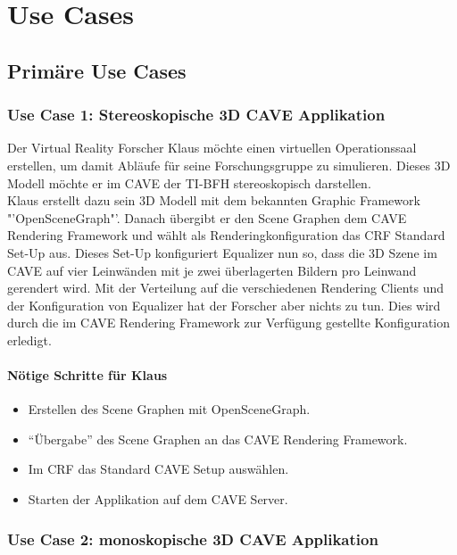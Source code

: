\chapter{Use Cases}

\section{Prim\"are Use Cases}

\subsection{Use Case 1: Stereoskopische 3D CAVE Applikation}

Der Virtual Reality Forscher Klaus m\"ochte einen virtuellen Operationssaal erstellen, um damit Abl\"aufe f\"ur seine Forschungsgruppe zu simulieren. Dieses 3D Modell m\"ochte er im CAVE der TI-BFH stereoskopisch darstellen.\\ 
Klaus erstellt dazu sein 3D Modell mit dem bekannten Graphic Framework "'OpenSceneGraph"'. Danach \"ubergibt er den Scene Graphen dem CAVE Rendering Framework und w\"ahlt als Renderingkonfiguration das CRF Standard Set-Up aus. Dieses Set-Up konfiguriert Equalizer nun so, dass die 3D Szene im CAVE auf vier Leinw\"anden mit je zwei \"uberlagerten Bildern pro Leinwand gerendert wird. Mit der Verteilung auf die verschiedenen Rendering Clients und der Konfiguration von Equalizer hat der Forscher aber nichts zu tun. Dies wird durch die im CAVE Rendering Framework zur Verf\"ugung gestellte Konfiguration erledigt. 

\subsubsection{N\"otige Schritte f\"ur Klaus}

\begin{itemize}
	\item Erstellen des Scene Graphen mit OpenSceneGraph.
	\item "`\"Ubergabe"' des Scene Graphen an das CAVE Rendering Framework.
	\item Im CRF das Standard CAVE Setup ausw\"ahlen.
	\item Starten der Applikation auf dem CAVE Server.
\end{itemize}

\subsection{Use Case 2: monoskopische 3D CAVE Applikation}

